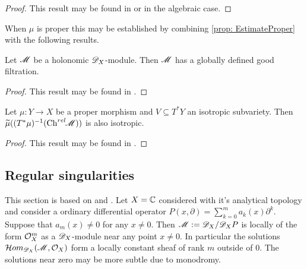 \begin{proof}
  This result may be found in \cite[Chapter 4]{sabbah2011introduction} or \cite[Chapter 3]{hotta2007d} in the algebraic case.
\end{proof}
When $\mu$ is proper this may be established by combining \cref{prop: EstimateProper} with the following results.
\begin{lemma}
  Let $\mathscr{M}$ be a holonomic $\mathscr{D}_X$-module. Then $\mathscr{M}$ has a globally defined good filtration.
\end{lemma}
\begin{proof}
  This result may be found in \cite[Chapter 4]{sabbah2011introduction}.
\end{proof}
\begin{lemma}\label{lem: IsotropicDirectImage}
  Let $\mu:Y\to X$ be a proper morphism and $V\subseteq T^*Y$ an isotropic subvariety. Then $\widetilde{\mu}((T^*\mu)^{-1}(\operatorname{Ch}^{rel}\mkern-5mu \mathscr{M}) )$ is also isotropic.
\end{lemma}
\begin{proof}
  This result may be found in \cite{kashiwara1976b}.
\end{proof}
\subsection{Regular singularities}
This section is based on \cite[Chapter 5]{kashiwara2003d} and \cite[Chapter 6]{hotta2007d}.
Let $X=\mathbb{C}$ considered with it's analytical topology and consider a ordinary differential operator
$P(x,\partial) = \sum_{k=0}^m a_k(x)\partial^k.$
Suppose that $a_m(x)\neq 0$ for any $x\neq 0$.
Then $\mathscr{M} :=\mathscr{D}_X/\mathscr{D}_X P$ is locally of the form $\mathcal{O}_X^m$ as a $\mathscr{D}_X$-module near any point $x\neq 0$.
In particular the solutions $\mathcal{H}om_{\mathscr{D}_X}(\mathscr{M},\mathcal{O}_X)$ form a locally constant sheaf of rank $m$ outside of $0$.
The solutions near zero may be more subtle due to monodromy.

